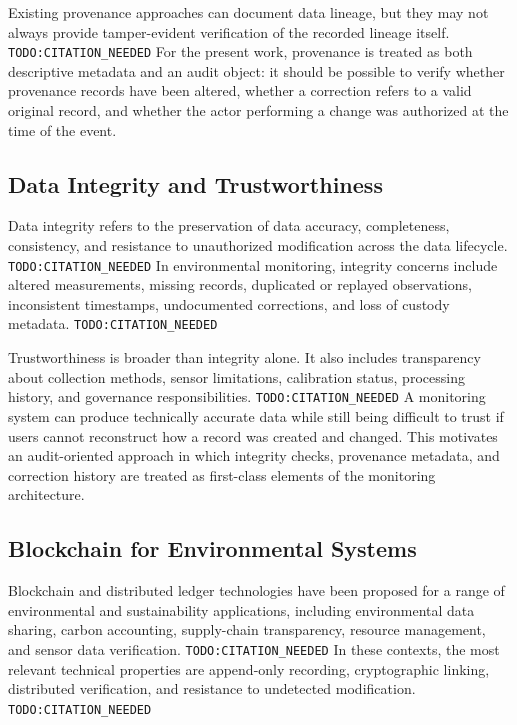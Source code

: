 Existing provenance approaches can document data lineage, but they may not always provide tamper-evident verification of the recorded lineage itself. \texttt{TODO:CITATION\_NEEDED} For the present work, provenance is treated as both descriptive metadata and an audit object: it should be possible to verify whether provenance records have been altered, whether a correction refers to a valid original record, and whether the actor performing a change was authorized at the time of the event.

\subsection{Data Integrity and Trustworthiness}

Data integrity refers to the preservation of data accuracy, completeness, consistency, and resistance to unauthorized modification across the data lifecycle. \texttt{TODO:CITATION\_NEEDED} In environmental monitoring, integrity concerns include altered measurements, missing records, duplicated or replayed observations, inconsistent timestamps, undocumented corrections, and loss of custody metadata. \texttt{TODO:CITATION\_NEEDED}

Trustworthiness is broader than integrity alone. It also includes transparency about collection methods, sensor limitations, calibration status, processing history, and governance responsibilities. \texttt{TODO:CITATION\_NEEDED} A monitoring system can produce technically accurate data while still being difficult to trust if users cannot reconstruct how a record was created and changed. This motivates an audit-oriented approach in which integrity checks, provenance metadata, and correction history are treated as first-class elements of the monitoring architecture.

\subsection{Blockchain for Environmental Systems}

Blockchain and distributed ledger technologies have been proposed for a range of environmental and sustainability applications, including environmental data sharing, carbon accounting, supply-chain transparency, resource management, and sensor data verification. \texttt{TODO:CITATION\_NEEDED} In these contexts, the most relevant technical properties are append-only recording, cryptographic linking, distributed verification, and resistance to undetected modification. \texttt{TODO:CITATION\_NEEDED}

